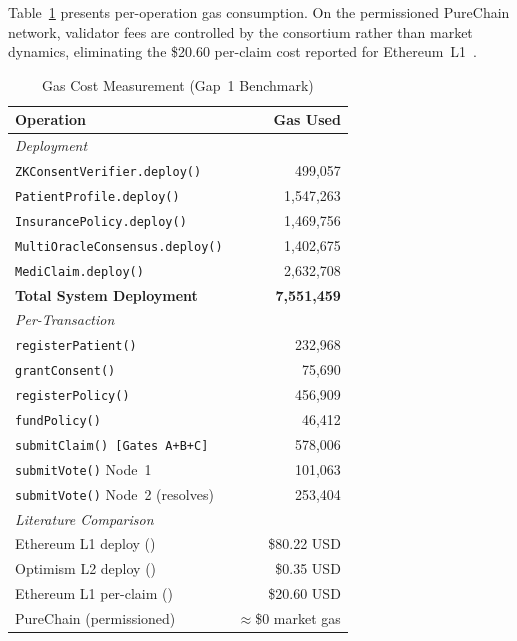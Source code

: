 \documentclass[journal]{IEEEtran}
\begin{document}
Table~\ref{tab:gas} presents per-operation gas consumption. On the permissioned
PureChain network, validator fees are controlled by the consortium rather than
market dynamics, eliminating the \$20.60 per-claim cost reported for
Ethereum~L1~\cite{lit:arxiv2407}.

\begin{table}[h]
\centering
\caption{Gas Cost Measurement (Gap~1 Benchmark)}
\label{tab:gas}
\begin{tabular}{@{}lr@{}}
\toprule
Operation & Gas Used \\
\midrule
\multicolumn{2}{l}{\textit{Deployment}} \\
\texttt{ZKConsentVerifier.deploy()} & 499,057 \\
\texttt{PatientProfile.deploy()}    & 1,547,263 \\
\texttt{InsurancePolicy.deploy()}   & 1,469,756 \\
\texttt{MultiOracleConsensus.deploy()} & 1,402,675 \\
\texttt{MediClaim.deploy()}         & 2,632,708 \\
\textbf{Total System Deployment}    & \textbf{7,551,459} \\
\midrule
\multicolumn{2}{l}{\textit{Per-Transaction}} \\
\texttt{registerPatient()}          & 232,968 \\
\texttt{grantConsent()}             & 75,690 \\
\texttt{registerPolicy()}           & 456,909 \\
\texttt{fundPolicy()}               & 46,412 \\
\texttt{submitClaim() [Gates A+B+C]} & 578,006 \\
\texttt{submitVote()} Node~1        & 101,063 \\
\texttt{submitVote()} Node~2 (resolves) & 253,404 \\
\midrule
\multicolumn{2}{l}{\textit{Literature Comparison}} \\
Ethereum L1 deploy (\cite{lit:arxiv2407}) & \$80.22 USD \\
Optimism L2 deploy (\cite{lit:arxiv2407}) & \$0.35 USD \\
Ethereum L1 per-claim (\cite{lit:arxiv2407}) & \$20.60 USD \\
PureChain (permissioned) & $\approx$\$0 market gas \\
\bottomrule
\end{tabular}
\end{table}
\end{document}
